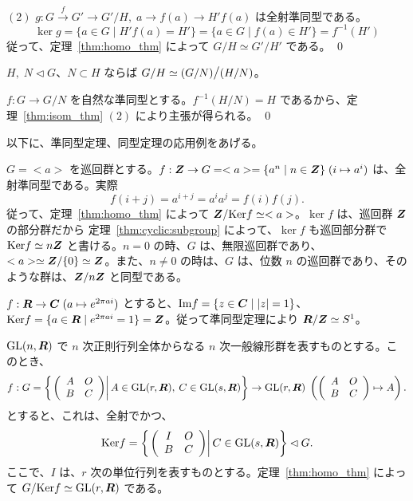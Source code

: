 \smallskip
$(2)$ $g: G \stackrel{f}{\to} G' \to G'/H,\;a\to f(a) \to H'f(a)$ は全射準同型である。
$$\ker g = \{a\in G\mid H'f(a) = H'\} = \{a\in G\mid f(a)\in H'\} = f^{-1}(H')$$
従って、定理~\ref{thm:homo_thm} によって $G/H\simeq G'/H'$ である。
\qed

\begin{cor} $H,\;N\lhd G$、$N\subset H$ ならば $G/H \simeq (G/N)\mbox{\large$/$}(H/N)$。
\end{cor}
\proof
$f:G\to G/N$ を自然な準同型とする。$f^{-1}(H/N) = H$ であるから、定理~\ref{thm:isom_thm} $(2)$ により主張が得られる。
\qed

\medskip
以下に、準同型定理、同型定理の応用例をあげる。

\begin{eg}
$G = <a>$ を巡回群とする。$f:\mbox{\boldmath $Z$} \to G = <a> = \{a^n\mid n\in\mbox{\boldmath $Z$}\}\;(i\mapsto a^i)$ は、全射準同型である。実際
$$f(i+j) = a^{i+j} = a^ia^j = f(i)f(j).$$
従って、定理~\ref{thm:homo_thm} によって $\mbox{\boldmath $Z$}/\mbox{{\rm Ker}} f\simeq <a>$。$\ker f$ は、巡回群 $\mbox{\boldmath $Z$}$ の部分群だから 定理~\ref{thm:cyclic:subgroup} によって、$\ker f$ も巡回部分群で $\mbox{{\rm Ker}} f \simeq n\mbox{\boldmath $Z$}$ と書ける。$n = 0$ の時、$G$  は、無限巡回群であり、$<a>\simeq \mbox{\boldmath $Z$}/\{0\}\simeq \mbox{\boldmath $Z$}$。また、$n\neq 0$ の時は、$G$  は、位数 $n$ の巡回群であり、そのような群は、$\mbox{\boldmath $Z$}/n\mbox{\boldmath $Z$}$ と同型である。
\end{eg}

\begin{eg}
$f:\mbox{\boldmath $R$} \to \mbox{\boldmath $C$}\;(a\mapsto e^{2\pi ai})$ とすると、$\mbox{{\rm Im}} f = \{z\in\mbox{\boldmath $C$}\mid |z| = 1\}$、$\mbox{{\rm Ker}} f = \{a\in\mbox{\boldmath $R$}\mid e^{2\pi ai} = 1\} = \mbox{\boldmath $Z$}$。従って準同型定理により $\mbox{\boldmath $R$}/\mbox{\boldmath $Z$} \simeq S^1$。
\end{eg}

\begin{eg} $\mbox{{\rm GL}}(n,\mbox{\boldmath $R$})$ で $n$ 次正則行列全体からなる $n$ 次一般線形群を表すものとする。このとき、
$$f:G = \left\{\left.\left(\begin{array}{cc} A & O\\ B & C\end{array}\right)\right| A\in \mbox{{\rm GL}}(r,\mbox{\boldmath $R$}),\:C\in \mbox{{\rm GL}}(s,\mbox{\boldmath $R$})\right\} \to \mbox{{\rm GL}}(r,\mbox{\boldmath $R$})\;\left(\left(\begin{array}{cc} A & O\\ B & C\end{array}\right)\mapsto A\right).$$
とすると、これは、全射でかつ、
$$\mbox{{\rm Ker}} f = \left\{\left.\left(\begin{array}{cc} I & O \\ B & C \end{array}\right)\right| C\in\mbox{{\rm GL}}(s,\mbox{\boldmath $R$})\right\}\lhd G.$$
ここで、$I$ は、$r$ 次の単位行列を表すものとする。定理~\ref{thm:homo_thm} によって $G/\mbox{{\rm Ker}} f \simeq \mbox{{\rm GL}}(r,\mbox{\boldmath $R$})$ である。
\end{eg}

